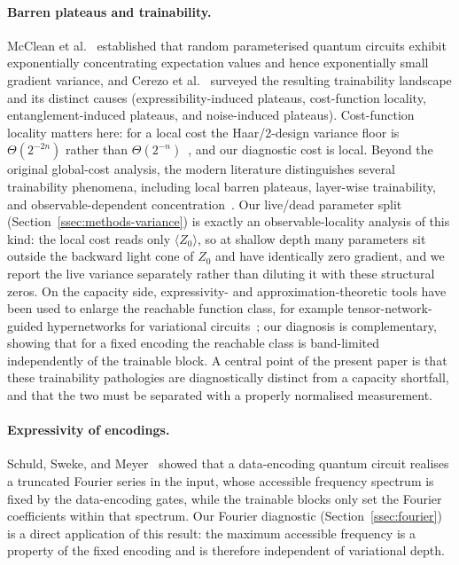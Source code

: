\documentclass[a4paper,12pt]{iopart}
\newcommand{\Zexp}[1]{\langle Z_{#1}\rangle}
\begin{document}
\paragraph{Barren plateaus and trainability.}
McClean et al.~\cite{mcclean2018} established that random parameterised quantum
circuits exhibit exponentially concentrating expectation values and hence
exponentially small gradient variance, and Cerezo et al.~\cite{cerezo2021}
surveyed the resulting trainability landscape and its distinct causes
(expressibility-induced plateaus, cost-function locality, entanglement-induced
plateaus, and noise-induced plateaus). Cost-function locality matters here: for
a local cost the Haar/2-design variance floor is $\Theta(2^{-2n})$ rather than
$\Theta(2^{-n})$~\cite{cerezo2021costlocality}, and our diagnostic cost is
local. Beyond the original global-cost analysis, the modern literature
distinguishes several trainability phenomena, including local barren plateaus,
layer-wise trainability, and observable-dependent
concentration~\cite{cerezo2021costlocality,uvarov2021locality,ortiz2021entanglement}.
Our live/dead parameter split (Section~\ref{ssec:methods-variance}) is exactly
an observable-locality analysis of this kind: the local cost reads only
$\Zexp{0}$, so at shallow depth many parameters sit outside the backward light
cone of $Z_0$ and have identically zero gradient, and we report the live
variance separately rather than diluting it with these structural zeros. On the
capacity side, expressivity- and approximation-theoretic tools have been used to
enlarge the reachable function class, for example tensor-network-guided
hypernetworks for variational circuits~\cite{qi2026tensorhyper}; our diagnosis
is complementary, showing that for a fixed encoding the reachable class is
band-limited independently of the trainable block. A central point of the
present paper is that these trainability pathologies are diagnostically distinct
from a capacity shortfall, and that the two must be separated with a properly
normalised measurement.

\paragraph{Expressivity of encodings.}
Schuld, Sweke, and Meyer~\cite{schuld2021effect} showed that a data-encoding
quantum circuit realises a truncated Fourier series in the input, whose
accessible frequency spectrum is fixed by the data-encoding gates, while the
trainable blocks only set the Fourier coefficients within that spectrum. Our
Fourier diagnostic (Section~\ref{ssec:fourier}) is a direct application of this
result: the maximum accessible frequency is a property of the fixed encoding
and is therefore independent of variational depth.
\end{document}
